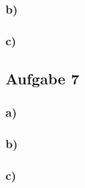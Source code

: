 \documentclass[11pt]{article}
\begin{document}
\subsubsection*{b)}

\subsubsection*{c)}

\subsection*{Aufgabe 7}
\subsubsection*{a)}

\subsubsection*{b)}

\subsubsection*{c)}
\end{document}

